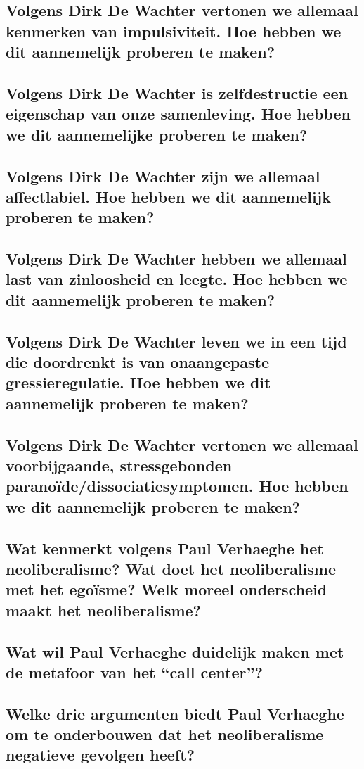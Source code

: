 \documentclass[main.tex]{subfiles}
\begin{document}
\subsection{Volgens Dirk De Wachter vertonen we allemaal kenmerken van impulsiviteit. Hoe hebben we dit aannemelijk proberen te maken?}
\subsection{Volgens Dirk De Wachter is zelfdestructie een eigenschap van onze samenleving. Hoe hebben we dit aannemelijke proberen te maken?}
\subsection{Volgens Dirk De Wachter zijn we allemaal affectlabiel. Hoe hebben we dit aannemelijk proberen te maken?}
\subsection{Volgens Dirk De Wachter hebben we allemaal last van zinloosheid en leegte. Hoe hebben we dit aannemelijk proberen te maken?}
\subsection{Volgens Dirk De Wachter leven we in een tijd die doordrenkt is van onaangepaste gressieregulatie. Hoe hebben we dit aannemelijk proberen te maken?}
\subsection{Volgens Dirk De Wachter vertonen we allemaal voorbijgaande, stressgebonden paranoïde/dissociatiesymptomen. Hoe hebben we dit aannemelijk proberen te maken?}
\subsection{Wat kenmerkt volgens Paul Verhaeghe het neoliberalisme? Wat doet het neoliberalisme met het egoïsme? Welk moreel onderscheid maakt het neoliberalisme?}
\subsection{Wat wil Paul Verhaeghe duidelijk maken met de metafoor van het “call center”?}
\subsection{Welke drie argumenten biedt Paul Verhaeghe om te onderbouwen dat het neoliberalisme negatieve gevolgen heeft?}
\end{document}
